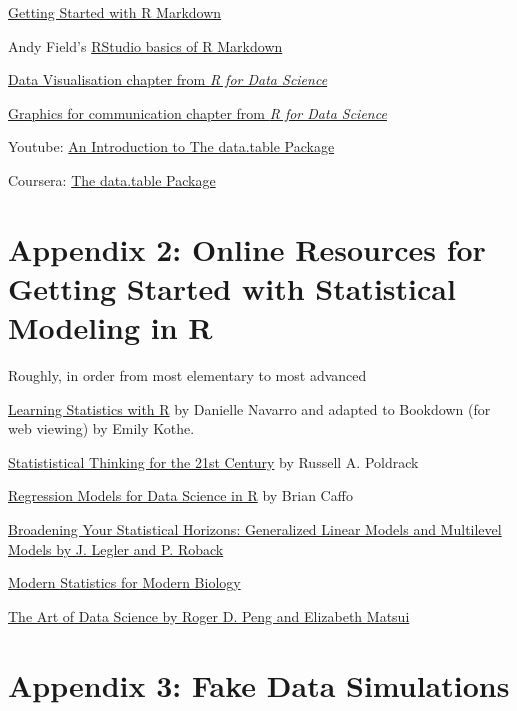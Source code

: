 \documentclass[]{book}
\begin{document}
\href{https://www.rstudio.com/resources/webinars/getting-started-with-r-markdown/}{Getting Started with R Markdown}

Andy Field's \href{https://www.youtube.com/watch?v=u4ZdvYXjsIo}{RStudio basics of R Markdown}

\href{http://r4ds.had.co.nz/data-visualisation.html}{Data Visualisation chapter from \emph{R for Data Science}}

\href{http://r4ds.had.co.nz/graphics-for-communication.html}{Graphics for communication chapter from \emph{R for Data Science}}

Youtube: \href{https://www.youtube.com/watch?v=pc1ARG6kbAM}{An Introduction to The data.table Package}

Coursera: \href{https://www.coursera.org/learn/data-cleaning/lecture/trMZ7/the-data-table-package}{The data.table Package}

\hypertarget{appendix-2-online-resources-for-getting-started-with-statistical-modeling-in-r}{%
\chapter*{Appendix 2: Online Resources for Getting Started with Statistical Modeling in R}\label{appendix-2-online-resources-for-getting-started-with-statistical-modeling-in-r}}

Roughly, in order from most elementary to most advanced

\href{https://https://learningstatisticswithr-bookdown.netlify.com}{Learning Statistics with R} by Danielle Navarro and adapted to Bookdown (for web viewing) by Emily Kothe.

\href{http://statsthinking21.org}{Statististical Thinking for the 21st Century} by Russell A. Poldrack

\href{https://leanpub.com/regmods}{Regression Models for Data Science in R} by Brian Caffo

\href{https://bookdown.org/roback/bookdown-bysh/}{Broadening Your Statistical Horizons: Generalized Linear Models and Multilevel Models by J. Legler and P. Roback}

\href{https://www.huber.embl.de/msmb/index.html}{Modern Statistics for Modern Biology}

\href{https://bookdown.org/rdpeng/artofdatascience/}{The Art of Data Science by Roger D. Peng and Elizabeth Matsui}

\hypertarget{appendix-3-fake-data-simulations}{%
\chapter*{Appendix 3: Fake Data Simulations}\label{appendix-3-fake-data-simulations}}
\end{document}
